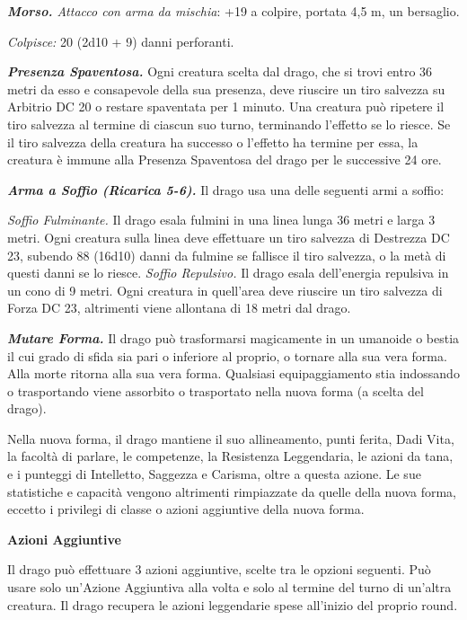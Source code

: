\begin{multicols}{2}
\emph{\textbf{Morso.} Attacco con arma da mischia}: +19 a colpire,
portata 4,5 m, un bersaglio.

\emph{Colpisce:} 20 (2d10 + 9) danni perforanti.

\emph{\textbf{Presenza Spaventosa.}} Ogni creatura scelta dal drago, che
si trovi entro 36 metri da esso e consapevole della sua presenza, deve
riuscire un tiro salvezza su Arbitrio DC 20 o restare spaventata per 1
minuto. Una creatura può ripetere il tiro salvezza al termine di ciascun
suo turno, terminando l'effetto se lo riesce. Se il tiro salvezza della
creatura ha successo o l'effetto ha termine per essa, la creatura è
immune alla Presenza Spaventosa del drago per le successive 24 ore.

\emph{\textbf{Arma a Soffio (Ricarica 5-6).}} Il drago usa una delle
seguenti armi a soffio:

\emph{Soffio Fulminante.} Il drago esala fulmini in una linea lunga 36
metri e larga 3 metri. Ogni creatura sulla linea deve effettuare un tiro
salvezza di Destrezza DC 23, subendo 88 (16d10) danni da fulmine se
fallisce il tiro salvezza, o la metà di questi danni se lo riesce.
\emph{Soffio Repulsivo.} Il drago esala dell'energia repulsiva in un
cono di 9 metri. Ogni creatura in quell'area deve riuscire un tiro
salvezza di Forza DC 23, altrimenti viene allontana di 18 metri dal
drago.

\emph{\textbf{Mutare Forma.}} Il drago può trasformarsi magicamente in
un umanoide o bestia il cui grado di sfida sia pari o inferiore al
proprio, o tornare alla sua vera forma. Alla morte ritorna alla sua vera
forma. Qualsiasi equipaggiamento stia indossando o trasportando viene
assorbito o trasportato nella nuova forma (a scelta del drago).

Nella nuova forma, il drago mantiene il suo allineamento, punti ferita,
Dadi Vita, la facoltà di parlare, le competenze, la Resistenza
Leggendaria, le azioni da tana, e i punteggi di Intelletto, Saggezza e
Carisma, oltre a questa azione. Le sue statistiche e capacità vengono
altrimenti rimpiazzate da quelle della nuova forma, eccetto i privilegi
di classe o azioni aggiuntive della nuova forma.

\textbf{Azioni Aggiuntive}

Il drago può effettuare 3 azioni aggiuntive, scelte tra le opzioni
seguenti. Può usare solo un'Azione Aggiuntiva alla volta e solo al
termine del turno di un'altra creatura. Il drago recupera le azioni
leggendarie spese all'inizio del proprio round.


\end{multicols}
